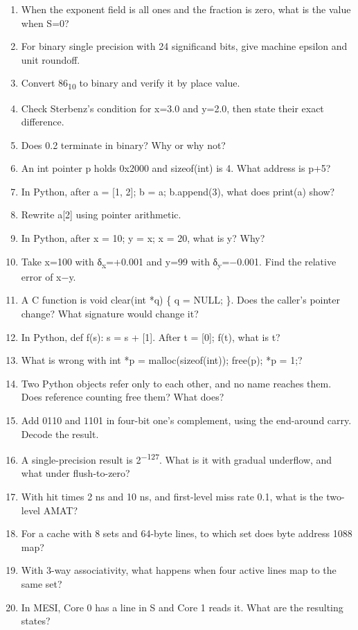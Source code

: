 \documentclass[11pt]{article}
\begin{document}
\begin{keepsection}
\begin{enumerate}
\item When the exponent field is all ones and the fraction is zero, what is the value when S=0?
\item For binary single precision with 24 significand bits, give machine epsilon and unit roundoff.
\item Convert 86\textsubscript{10} to binary and verify it by place value.
\item Check Sterbenz’s condition for x=3.0 and y=2.0, then state their exact difference.
\item Does 0.2 terminate in binary? Why or why not?
\item An int pointer p holds 0x2000 and sizeof(int) is 4. What address is p+5?
\item In Python, after a = [1, 2]; b = a; b.append(3), what does print(a) show?
\item Rewrite a[2] using pointer arithmetic.
\item In Python, after x = 10; y = x; x = 20, what is y? Why?
\item Take x=100 with δ\textsubscript{x}=+0.001 and y=99 with δ\textsubscript{y}=\ensuremath{-}0.001. Find the relative error of x\ensuremath{-}y.
\item A C function is void clear(int *q) \{ q = NULL; \}. Does the caller’s pointer change? What signature would change it?
\item In Python, def f(s): s = s + [1]. After t = [0]; f(t), what is t?
\item What is wrong with int *p = malloc(sizeof(int)); free(p); *p = 1;?
\item Two Python objects refer only to each other, and no name reaches them. Does reference counting free them? What does?
\item Add 0110 and 1101 in four-bit one’s complement, using the end-around carry. Decode the result.
\item A single-precision result is 2\textsuperscript{\ensuremath{-}127}. What is it with gradual underflow, and what under flush-to-zero?
\item With hit times 2 ns and 10 ns, and first-level miss rate 0.1, what is the two-level AMAT?
\item For a cache with 8 sets and 64-byte lines, to which set does byte address 1088 map?
\item With 3-way associativity, what happens when four active lines map to the same set?
\item In MESI, Core 0 has a line in S and Core 1 reads it. What are the resulting states?

\end{enumerate}
\end{keepsection}
\end{document}
